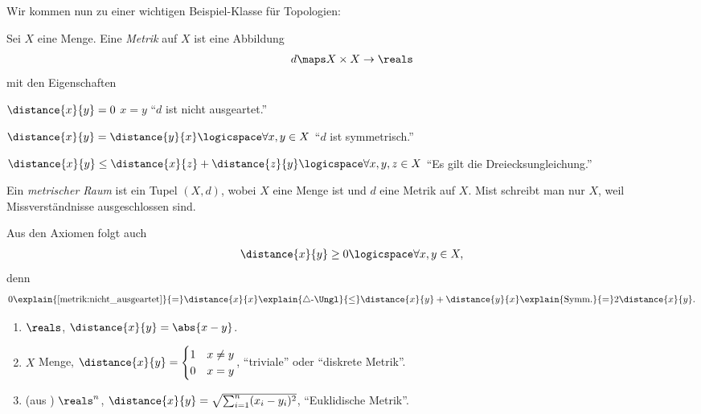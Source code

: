 Wir kommen nun zu einer wichtigen Beispiel-Klasse für Topologien:
\begin{definition}
    Sei \( X \) eine Menge. Eine \emph{Metrik} auf \( X \) ist eine Abbildung
    \begin{align*}
        d\maps X\times X \to \reals
    \end{align*}
    mit den Eigenschaften
    \begin{eigenschaftenenumerate}
        \item \label{metrik:nicht_ausgeartet}\( \distance{x}{y}=0 \) \tiff \( x=y \) \enquote{\( d \) ist nicht ausgeartet.}
        \item \label{metrik:symmetrisch}\( \distance{x}{y}=\distance{y}{x}\logicspace\forall x,y \in X \) \enquote{\( d \) ist symmetrisch.}
        \item \label{metrik:dreiecksungleichung} \( \distance{x}{y}\leq \distance{x}{z}+\distance{z}{y} \logicspace\forall x,y,z\in X\) \enquote{Es gilt die Dreiecksungleichung.} 
    \end{eigenschaftenenumerate}
    Ein \emph{metrischer Raum} ist ein Tupel \( (X,d) \), wobei \( X \) eine Menge ist und \( d \) eine Metrik auf \( X \). Mist schreibt man nur \( X \), weil Missverständnisse ausgeschlossen sind.
\end{definition}
\begin{bemerkung*}
    Aus den Axiomen folgt auch
    \begin{align*}
        \distance{x}{y}\geq 0 \logicspace \forall x,y \in X,
    \end{align*}
    denn
    \begin{align*}
        0\explain{\ref{metrik:nicht_ausgeartet}}{=}\distance{x}{x}\explain{\triangle\text{-\Ungl}}{\leq}\distance{x}{y}+\distance{y}{x}\explain{\text{Symm.}}{=}2\distance{x}{y}.
    \end{align*}
\end{bemerkung*}
\begin{beispiele*}
    \begin{enumerate}[label=\rechtsklammer{\roman*}, ref=\rechtsklammer{\roman*}]
        \item \label{metrik:beispiele:r}\( \reals \), \( \distance{x}{y}=\abs{x-y} \).
        \item \label{metrik:beispiele:diskret}\( X \) Menge, \( \distance{x}{y}=\begin{cases}
            1 & x\neq y\\
            0 & x=y
        \end{cases}
         \), \enquote{triviale} oder \enquote{diskrete Metrik}.
         
         \item\label{metrik:beispiele:r_n} (aus ) \( \reals^n \), \( \distance{x}{y}=\sqrt{\sum_{i=1}^{n} (x_i-y_i)^2} \), \enquote{Euklidische Metrik}.
    \end{enumerate}
\end{beispiele*}

